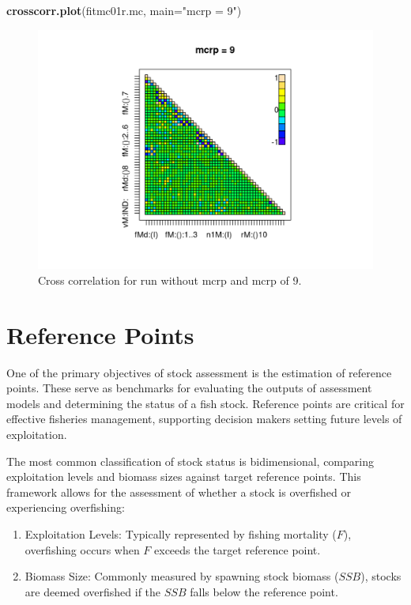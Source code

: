 \documentclass[
]{book}
\newenvironment{Shaded}{\begin{snugshade}}{\end{snugshade}}
\newcommand{\AttributeTok}[1]{\textcolor[rgb]{0.13,0.29,0.53}{#1}}
\newcommand{\FunctionTok}[1]{\textcolor[rgb]{0.13,0.29,0.53}{\textbf{#1}}}
\newcommand{\NormalTok}[1]{#1}
\newcommand{\StringTok}[1]{\textcolor[rgb]{0.31,0.60,0.02}{#1}}
\begin{document}
\begin{Shaded}
\begin{Highlighting}[]
\FunctionTok{crosscorr.plot}\NormalTok{(fitmc01r.mc, }\AttributeTok{main=}\StringTok{"mcrp = 9"}\NormalTok{)}
\end{Highlighting}
\end{Shaded}

\begin{figure}
\includegraphics[width=0.5\linewidth]{_bookdown_files/_main_files/figure-html/mcrp-2} \caption{Cross correlation for run without mcrp and mcrp of 9.}\label{fig:mcrp-2}
\end{figure}

\hypertarget{reference-points}{%
\chapter{Reference Points}\label{reference-points}}

One of the primary objectives of stock assessment is the estimation of reference points. These serve as benchmarks for evaluating the outputs of assessment models and determining the status of a fish stock. Reference points are critical for effective fisheries management, supporting decision makers setting future levels of exploitation.

The most common classification of stock status is bidimensional, comparing exploitation levels and biomass sizes against target reference points. This framework allows for the assessment of whether a stock is overfished or experiencing overfishing:

\begin{enumerate}
\def\labelenumi{\arabic{enumi}.}
\item
  Exploitation Levels: Typically represented by fishing mortality (\(F\)), overfishing occurs when \(F\) exceeds the target reference point.
\item
  Biomass Size: Commonly measured by spawning stock biomass (\(SSB\)), stocks are deemed overfished if the \(SSB\) falls below the reference point.
\end{enumerate}
\end{document}
